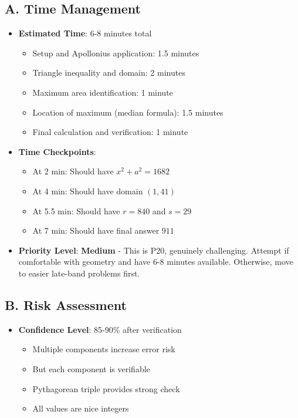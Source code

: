 \documentclass[12pt]{article}
\begin{document}
\begin{competitionbox}
\subsection*{A. Time Management}
\begin{itemize}[leftmargin=*]
    \item \textbf{Estimated Time}: 6-8 minutes total
    \begin{itemize}
        \item Setup and Apollonius application: 1.5 minutes
        \item Triangle inequality and domain: 2 minutes
        \item Maximum area identification: 1 minute
        \item Location of maximum (median formula): 1.5 minutes
        \item Final calculation and verification: 1 minute
    \end{itemize}
    
    \item \textbf{Time Checkpoints}: 
    \begin{itemize}
        \item At 2 min: Should have $x^2 + a^2 = 1682$
        \item At 4 min: Should have domain $(1, 41)$
        \item At 5.5 min: Should have $r = 840$ and $s = 29$
        \item At 7 min: Should have final answer $911$
    \end{itemize}
    
    \item \textbf{Priority Level}: \textbf{Medium} - This is P20, genuinely challenging. Attempt if comfortable with geometry and have 6-8 minutes available. Otherwise, move to easier late-band problems first.
\end{itemize}

\subsection*{B. Risk Assessment}
\begin{itemize}[leftmargin=*]
    \item \textbf{Confidence Level}: 85-90\% after verification
    \begin{itemize}
        \item Multiple components increase error risk
        \item But each component is verifiable
        \item Pythagorean triple provides strong check
        \item All values are nice integers
    \end{itemize}
    

\end{itemize}
\end{competitionbox}
\end{document}
